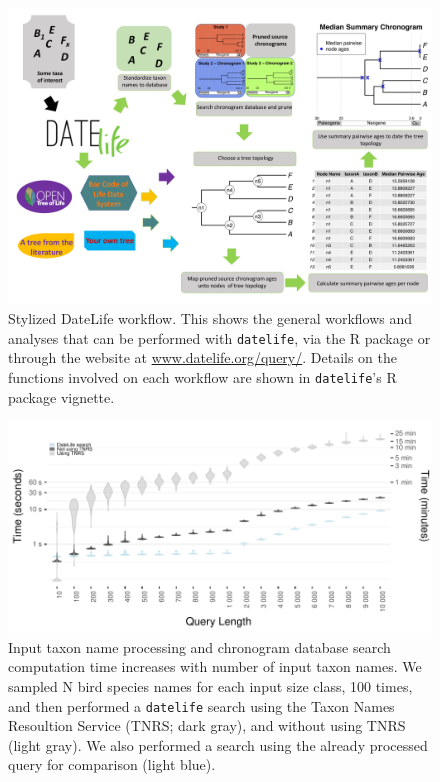 \documentclass[
  english,
  man]{apa6}
\begin{document}
\begin{figure}[!h]
\includegraphics{../figures/figure1/figure1-vertical-final.pdf}
\caption{Stylized DateLife workflow. This shows the general workflows and analyses that can be performed with \texttt{datelife}, via the R package or through the website  at \url{www.datelife.org/query/}. Details on the functions involved on each workflow are shown in \texttt{datelife}'s R package vignette.}
\label{fig:workflow}
\end{figure}
\newpage
\begin{figure}[!h]
\includegraphics[width=1\linewidth]{../figures/fig_runtime_main.pdf}
\caption{Input taxon name processing and chronogram database search computation time increases with number of input taxon names. We sampled N bird species names for each input size class, 100 times, and then performed a \texttt{datelife} search using the Taxon Names Resoultion Service (TNRS; dark gray), and without using TNRS (light gray). We also performed a search using the already processed query for comparison (light blue).}
\label{fig:runtime1}
\end{figure}
\end{document}
